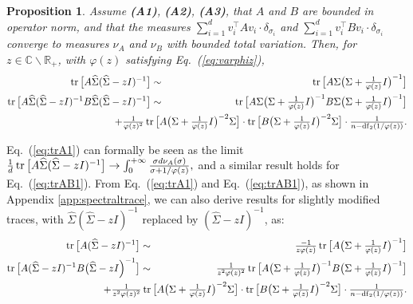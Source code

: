 \documentclass[11pt]{article}
\newcommand{\BEA}{\begin{eqnarray}}
\newcommand{\EEA}{\end{eqnarray}}
\newcommand{\tr}{\mathop{ \rm tr}}
\newcommand{\idm}{I}
\newcommand{\rb}{\mathbb{R}}
\newtheorem{proposition}{Proposition}
\newcommand{\eq}[1]{Eq.~(\ref{eq:#1})}
\def \hS{ \widehat{ \Sigma} }
\def \S{  { \Sigma} }
\begin{document}
\begin{proposition}
\label{prop:spectral}
Assume \textbf{(A1)}, \textbf{(A2)},  \textbf{(A3)}, that $A$ and $B$ are bounded in operator norm, and that
the measures $   \sum_{i=1}^d   v_i ^\top A v_i  \cdot\delta_{\sigma_i}$
and $   \sum_{i=1}^d   v_i ^\top B v_i  \cdot\delta_{\sigma_i}$ converge to measures $\nu_A$ and $\nu_B$ with bounded total variation. Then, for $z \in \mathbb{C} \backslash \rb_+$, with $\varphi(z)$ satisfying \eq{varphiz},
\BEA
\label{eq:trA1}
\tr \big[ A  \hS ( \hS - z \idm)^{-1}  \big] 
& \sim &  \textstyle \tr \big[  A \S \big( \S + \frac{1}{\varphi(z)} \idm \big)^{-1} \big]
\\
\label{eq:trAB1}
\tr \big[ A  \hS ( \hS -z \idm)^{-1}  B  \hS ( \hS -z \idm)^{-1}\big]  
& \sim &  \textstyle \tr \big[  A \S \big( \S +  \frac{1}{\varphi(z)} \idm \big)^{-1} B \S \big( \S +  \frac{1}{\varphi(z)} \idm \big)^{-1} \big]  \\
\notag& & \hspace*{-2cm} \textstyle+ \frac{1}{ \varphi(z)^2}   \tr \big[
    A    \big( \S + \frac{1}{\varphi(z)} \idm \big)^{-2}  \Sigma \big]
     \cdot 
     \tr \big[
    B    \big( \S + \frac{1}{\varphi(z)} \idm \big)^{-2}  \Sigma \big]
    \cdot   \frac{1}{ n -  {\rm df}_2(1/\varphi(z))  }. 
    \EEA
\end{proposition}
\eq{trA1} can formally be seen as the limit
$  
\frac{1}{d} \tr \big[ A  \hS ( \hS - z \idm)^{-1}  \big] \to \int_0^{+\infty} \frac{\sigma d\nu_A(\sigma)}{\sigma + 1/\varphi(z)},
$
and a similar result holds for \eq{trAB1}.
From \eq{trA1} and \eq{trAB1}, as shown in Appendix \ref{app:spectraltrace}, we can also derive results for slightly modified traces, with $\hS  ( \hS - z \idm)^{-1} $ replaced by $ ( \hS - z \idm)^{-1} $, as:
\BEA
\label{eq:trA2}
\tr \big[ A   ( \hS - z \idm)^{-1}  \big] 
& \sim & \textstyle \frac{-1}{z \varphi(z)} \tr \big[ A \big(  \S + \frac{1}{\varphi(z)} \idm \big)^{-1} \big]
\\
\label{eq:trAB2}
\tr \big[ A    ( \hS -z \idm)^{-1}  B    \big( \hS -z \idm \Big)^{-1}\big]  
& \sim &  \textstyle\frac{1}{z^2 \varphi(z)^2}  \tr \big[ A   \big( \S + \frac{1}{\varphi(z)} \idm \big)^{-1}    B   \big( \S + \frac{1}{\varphi(z)} \idm \big)^{-1}    \big] 
 \\
\notag & & \textstyle
     \hspace*{-2cm}+ \frac{1}{z^2 \varphi(z)^2}   \tr \big[
    A    \big( \S + \frac{1}{\varphi(z)} \idm \big)^{-2}  \Sigma \big]
     \cdot 
     \tr \big[
    B    \big( \S + \frac{1}{\varphi(z)} \idm \big)^{-2}  \Sigma \big]
    \cdot   \frac{1}{ n -  {\rm df}_2(1/\varphi(z))  }.   \EEA
\end{document}
